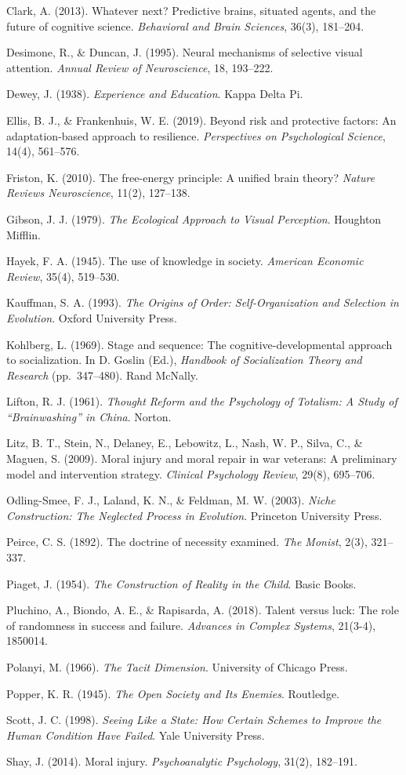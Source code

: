 \documentclass[
]{article}
\begin{document}
Clark, A. (2013). Whatever next? Predictive brains, situated agents, and
the future of cognitive science. \emph{Behavioral and Brain Sciences},
36(3), 181--204.

Desimone, R., \& Duncan, J. (1995). Neural mechanisms of selective
visual attention. \emph{Annual Review of Neuroscience}, 18, 193--222.

Dewey, J. (1938). \emph{Experience and Education}. Kappa Delta Pi.

Ellis, B. J., \& Frankenhuis, W. E. (2019). Beyond risk and protective
factors: An adaptation-based approach to resilience. \emph{Perspectives
on Psychological Science}, 14(4), 561--576.

Friston, K. (2010). The free-energy principle: A unified brain theory?
\emph{Nature Reviews Neuroscience}, 11(2), 127--138.

Gibson, J. J. (1979). \emph{The Ecological Approach to Visual
Perception}. Houghton Mifflin.

Hayek, F. A. (1945). The use of knowledge in society. \emph{American
Economic Review}, 35(4), 519--530.

Kauffman, S. A. (1993). \emph{The Origins of Order: Self-Organization
and Selection in Evolution}. Oxford University Press.

Kohlberg, L. (1969). Stage and sequence: The cognitive-developmental
approach to socialization. In D. Goslin (Ed.), \emph{Handbook of
Socialization Theory and Research} (pp.~347--480). Rand McNally.

Lifton, R. J. (1961). \emph{Thought Reform and the Psychology of
Totalism: A Study of ``Brainwashing'' in China}. Norton.

Litz, B. T., Stein, N., Delaney, E., Lebowitz, L., Nash, W. P., Silva,
C., \& Maguen, S. (2009). Moral injury and moral repair in war veterans:
A preliminary model and intervention strategy. \emph{Clinical Psychology
Review}, 29(8), 695--706.

Odling-Smee, F. J., Laland, K. N., \& Feldman, M. W. (2003). \emph{Niche
Construction: The Neglected Process in Evolution}. Princeton University
Press.

Peirce, C. S. (1892). The doctrine of necessity examined. \emph{The
Monist}, 2(3), 321--337.

Piaget, J. (1954). \emph{The Construction of Reality in the Child}.
Basic Books.

Pluchino, A., Biondo, A. E., \& Rapisarda, A. (2018). Talent versus
luck: The role of randomness in success and failure. \emph{Advances in
Complex Systems}, 21(3-4), 1850014.

Polanyi, M. (1966). \emph{The Tacit Dimension}. University of Chicago
Press.

Popper, K. R. (1945). \emph{The Open Society and Its Enemies}.
Routledge.

Scott, J. C. (1998). \emph{Seeing Like a State: How Certain Schemes to
Improve the Human Condition Have Failed}. Yale University Press.

Shay, J. (2014). Moral injury. \emph{Psychoanalytic Psychology}, 31(2),
182--191.
\end{document}
